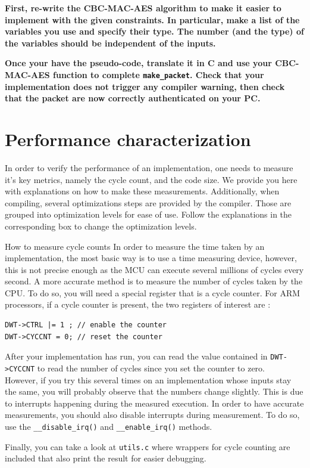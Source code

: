 \textbf{
    First, re-write the CBC-MAC-AES algorithm to make it easier to
    implement with the given constraints. In particular, make a list of the
    variables you use and specify their type. The number (and the type) of the
    variables should be independent of the inputs.
}

\textbf{
    Once your have the pseudo-code, translate it in C and use your CBC-MAC-AES
    function to complete \texttt{make\_packet}.
    Check that your implementation does not trigger any compiler warning, then
    check that the packet are now correctly authenticated on your PC.
}

\section{Performance characterization}
In order to verify the performance of an implementation, one needs to measure it's key metrics, namely the cycle count, and the code size. We provide you here with explanations on how to make these measurements. Additionally, when compiling, several optimizations steps are provided by the compiler. Those are grouped into optimization levels for ease of use. Follow the explanations in the corresponding box to change the optimization levels.


\begin{bclogo}[couleur = gray!20, arrondi = 0.2, logo=\bcinfo]{How to measure cycle counts} In order to measure the time taken by an implementation, the most basic way is to use a time measuring device, however, this is not precise enough as the MCU can execute several millions of cycles every second. A more accurate method is to measure the number of cycles taken by the CPU. To do so, you will need a special register that is a cycle counter. For ARM processors, if a cycle counter is present, the two registers of interest are :
\begin{lstlisting}[style=customc]
DWT->CTRL |= 1 ; // enable the counter
DWT->CYCCNT = 0; // reset the counter
\end{lstlisting}
After your implementation has run, you can read the value contained in \texttt{DWT->CYCCNT} to read the number of cycles since you set the counter to zero.\\

However, if you try this several times on an implementation whose inputs stay the same, you will probably observe that the numbers change slightly. This is due to interrupts happening during the measured execution. In order to have accurate measurements, you should also disable interrupts during measurement. To do so, use the  \texttt{\_\_disable\_irq()} and \texttt{\_\_enable\_irq()} methods.

Finally, you can take a look at \texttt{utils.c} where wrappers for cycle counting are included that also print the result for easier debugging.
\end{bclogo}



